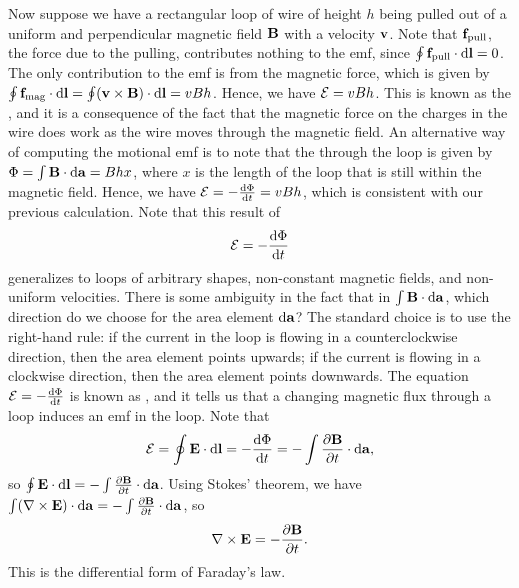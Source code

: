 Now suppose we have a rectangular loop of wire of height $h$ being pulled out of a uniform and perpendicular magnetic field $\mathbf{B}$ with a velocity $\mathbf{v}$. Note that $\mathbf{f}_{\text{pull}}$, the force due to the pulling, contributes nothing to the emf, since $\oint \mathbf{f}_{\text{pull}} \cdot \mathrm{d}\mathbf{l} = 0$. The only contribution to the emf is from the magnetic force, which is given by $\oint \mathbf{f}_{\text{mag}} \cdot \mathrm{d}\mathbf{l} = \oint (\mathbf{v} \times \mathbf{B}) \cdot \mathrm{d}\mathbf{l} = vBh$. Hence, we have $\mathcal{E} = vBh$. This is known as the , and it is a consequence of the fact that the magnetic force on the charges in the wire does work as the wire moves through the magnetic field. An alternative way of computing the motional emf is to note that the  through the loop is given by $\Phi = \int \mathbf{B} \cdot \mathrm{d}\mathbf{a} = Bhx$, where $x$ is the length of the loop that is still within the magnetic field. Hence, we have $\mathcal{E} = -\frac{\mathrm{d}\Phi}{\mathrm{d}t} = vBh$, which is consistent with our previous calculation. Note that this result of
\begin{align}
    \mathcal{E} = -\frac{\mathrm{d}\Phi}{\mathrm{d}t}
\end{align}
generalizes to loops of arbitrary shapes, non-constant magnetic fields, and non-uniform velocities. There is some ambiguity in the fact that in $\int \mathbf{B} \cdot \mathrm{d}\mathbf{a}$, which direction do we choose for the area element $\mathrm{d}\mathbf{a}$? The standard choice is to use the right-hand rule: if the current in the loop is flowing in a counterclockwise direction, then the area element points upwards; if the current is flowing in a clockwise direction, then the area element points downwards. The equation $\mathcal{E} = -\frac{\mathrm{d}\Phi}{\mathrm{d}t}$ is known as , and it tells us that a changing magnetic flux through a loop induces an emf in the loop. Note that
\begin{align}
    \mathcal{E} = \oint \mathbf{E} \cdot \mathrm{d}\mathbf{l} = -\frac{\mathrm{d}\Phi}{\mathrm{d}t} = -\int \frac{\partial{\mathbf{B}}}{\partial{t}} \cdot \mathrm{d}\mathbf{a},
\end{align}
so $\oint \mathbf{E} \cdot \mathrm{d}\mathbf{l} = -\int \frac{\partial{\mathbf{B}}}{\partial{t}} \cdot \mathrm{d}\mathbf{a}$. Using Stokes' theorem, we have $\int (\nabla \times \mathbf{E}) \cdot \mathrm{d}\mathbf{a} = -\int \frac{\partial{\mathbf{B}}}{\partial{t}} \cdot \mathrm{d}\mathbf{a}$, so
\begin{align}
    \nabla \times \mathbf{E} = -\frac{\partial{\mathbf{B}}}{\partial{t}}.
\end{align}
This is the differential form of Faraday's law.

